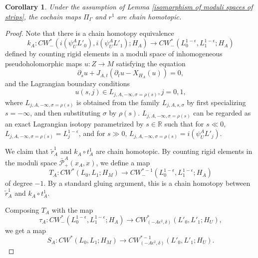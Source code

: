 \documentclass{amsart}
\newtheorem{corollary}[theorem]{Corollary}
\numberwithin{equation}{section}
\numberwithin{figure}{section}
\begin{document}
\begin{corollary}
	Under the assumption of Lemma \ref{isomorphism of moduli spaces of strips}, the cochain maps $\Pi_{\Gamma}$ and $r^{1}$ are chain homotopic.
\end{corollary}
\begin{proof}
	Note that there is a chain homotopy equivalence
\begin{equation*}
k_{A}: CW^{*}_{-}(i(\psi_{U}^{A} L'_{0}), i(\psi_{U}^{A} L'_{1}); H_{A}) \to CW^{*}_{-}(L_{0}^{1-\epsilon}, L_{1}^{1-\epsilon}; H_{A})
\end{equation*}
defined by counting rigid elements in a moduli space of inhomogeneous pseudoholomorphic maps $u: Z \to M$ satisfying the equation
\begin{equation*}
\partial_{s} u + J_{A, t}(\partial_{t} u - X_{H_{A}}(u)) = 0,
\end{equation*}
and the Lagrangian boundary conditions
\begin{equation*}
u(s, j) \in L_{j, A, -\infty, \sigma = \rho(s)}, j = 0, 1,
\end{equation*}
where $L_{j, A, -\infty, \sigma = \rho(s)}$ is obtained from the family $L_{j, A, s, \sigma}$ by first specializing $s = -\infty$, and then substituting $\sigma$ by $\rho(s)$. $L_{j, A, -\infty, \sigma = \rho(s)}$ can be regarded as an exact Lagrangian isotopy parametrized by $s \in \mathbb{R}$ such that for $s \ll 0$, $L_{j, A, -\infty, \sigma = \rho(s)} = L_{j}^{1-\epsilon}$, and for $s \gg 0$, $L_{j, A, -\infty, \sigma = \rho(s)} = i(\psi_{U}^{A} L'_{j})$. \par
	We claim that $\tilde{r}^{1}_{A}$ and $k_{A} \circ t^{1}_{A}$ are chain homotopic. By counting rigid elements in the moduli space $\bar{\mathcal{P}}_{+}^{A}(x_{A}, x)$, we define a map
\begin{equation*}
T_{A}: CW^{*}(L_{0}, L_{1}; H_{M}) \to CW^{*-1}_{-}(L_{0}^{1-\epsilon}, L_{1}^{1-\epsilon}; H_{A})
\end{equation*}
of degree $-1$. By a standard gluing argument, this is a chain homotopy between $\tilde{r}^{1}_{A}$ and $k_{A} \circ t^{1}_{A}$. \par
	Composing $T_{A}$ with the map
\begin{equation*}
\tau_{A}: CW^{*}_{-}(L_{0}^{1-\epsilon}, L_{1}^{1-\epsilon}; H_{A}) \to CW^{*}_{(-A\epsilon^{2}, \delta)}(L'_{0}, L'_{1}; H_{U}),
\end{equation*}
we get a map
\begin{equation*}
S_{A}: CW^{*}(L_{0}, L_{1}; H_{M}) \to CW^{*-1}_{(-A\epsilon^{2}, \delta)}(L'_{0}, L'_{1}; H_{U}).

\end{equation*}
\end{proof}
\end{document}
